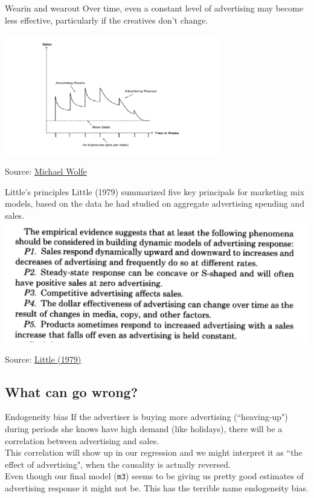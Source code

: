 \documentclass[10pt, aspectratio=169]{beamer}
\newcommand{\source}[1]{\begin{flushright} \footnotesize Source: {#1} \end{flushright} \normalsize}
\begin{document}
\begin{frame}{Wearin and wearout}
Over time, even a constant level of advertising may become less effective, particularly if the creatives don't change. 
\begin{center}
\includegraphics[width=0.7\textwidth]{images/adresponseovertime.png}
\end{center}
\source{\href{https://www.linkedin.com/pulse/new-tools-determining-measuring-wear-in-wear-out-media-michael-wolfe}{Michael Wolfe}}
\end{frame}

\begin{frame}{Little's principles}
Little (1979) summarized five key principals for marketing mix models, based on the data he had studied on aggregate advertising spending and sales. 
\includegraphics[width=\textwidth]{images/littleprincipals.png}
\source{\href{https://github.com/eleafeit/ad_response_tutorial/blob/master/Papers/Little1979AggregateAdvertisingModels.pdf}{Little (1979)}}
\end{frame}


\subsection{What can go wrong?}

\begin{frame}[fragile]{Endogeneity bias}
If the advertiser is buying more advertising (``heaving-up") during periods she knows have high demand (like holidays), there will be a correlation between advertising and sales. \\
\bigskip \pause
This correlation will show up in our regression and we might interpret it as ``the effect of advertising", when the causality is actually reversed. \\
\bigskip \pause 
Even though our final model (\verb|m3|) seems to be giving us pretty good estimates of advertising response it might not be.  This has the terrible name \alert{endogeneity bias}.
\end{frame}
\end{document}
